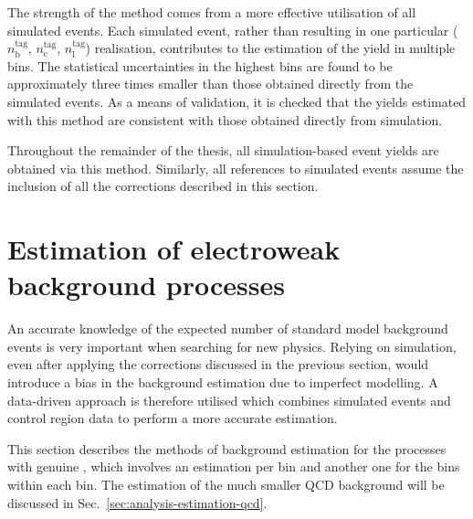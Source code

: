 The strength of the method comes from a more effective utilisation of all 
simulated events.
Each simulated event, rather than resulting in one particular ($n_\mathrm 
b^\mathrm{tag}$, $n_\mathrm c^\mathrm{tag}$, $n_\mathrm l^\mathrm{tag}$) 
realisation, contributes to the estimation of the yield in multiple \nb bins.
The statistical uncertainties in the highest \nb bins are found to be 
approximately three times smaller than those obtained directly from the 
simulated events.
As a means of validation, it is checked that the yields estimated with this 
method are consistent with those obtained directly from simulation.


Throughout the remainder of the thesis, all simulation-based event yields are 
obtained via this method. Similarly, all references to simulated events assume 
the inclusion of all the corrections described in this section. 

\section{Estimation of electroweak background processes}
\label{sec:analysis-estimation-ewk}
An accurate knowledge of the expected number of standard model background 
events is very important when searching for new physics. Relying on simulation, 
even after applying the corrections discussed in the previous section, would 
introduce a bias in the background estimation due to imperfect modelling. A 
data-driven approach is therefore utilised which combines simulated events and 
control region data to perform a more accurate estimation.

This section describes the methods of background estimation for the processes 
with genuine \met, which involves an estimation per \njnbht bin and another one 
for the \mht bins within each \njnbht bin. The estimation of the much smaller 
QCD background will be discussed in Sec.~\ref{sec:analysis-estimation-qcd}.

